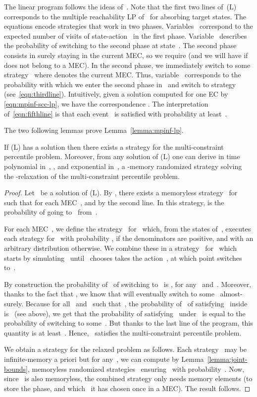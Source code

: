 \documentclass{llncs}
\begin{document}
  The linear program follows the ideas of~\cite{EKVY-lmcs08,BBCFK-lmcs14}. 
  Note that the first two lines of~(L) corresponds to the multiple reachability LP of~\cite{EKVY-lmcs08} for absorbing target states.
The equations encode strategies that work in two phases.
  Variables~ correspond to
  the expected number of visits of state-action~ in the first phase. Variable~ describes the probability 
  of switching to the second phase at state~.
  The second phase consists in surely staying in the current MEC, so we require 
  (and we will have  if  does not belong to a MEC).
  In the second phase, we immediately switch to some
	strategy~ where  denotes the current MEC. Thus, variable~ corresponds to the probability
  with which we enter the second phase in~ and switch to strategy~ (see~\eqref{eqn:thirdline}).
  Intuitively, given a solution  computed for one EC by \eqref{eqn:mpinf-scc-lp}, we have the correspondence
  .
  The interpretation of~\eqref{eqn:fifthline} is that each event~ is satisfied with probability at least~.

The two following lemmas prove Lemma~\ref{lemma:mpinf-lp}. 

\begin{lemma}
  If (L) has a solution then there exists a strategy for the multi-constraint percentile problem.
  Moreover, from any solution of (L) one can derive in time polynomial in~, , and exponential in~, a -memory randomized strategy
  solving the -relaxation of the multi-constraint percentile problem.
\end{lemma}

  
\begin{proof}
  Let~ be a solution of (L).
  By \cite[Theorem 3.2]{EKVY-lmcs08}, there exists a memoryless strategy~ for~ such that
   for each MEC~,
  and  by the second line.  
  In this strategy,  is the probability of going to~ from~.

  For each MEC~, we define the strategy~ for~ which, from the states of~,
  executes each strategy
   for~ with probability ,
  if the denominators are positive, and with an arbitrary distribution otherwise.
  We combine these in a strategy~ for~
  which starts by simulating~ until~ chooses takes the action~, at which point
   switches to~.

  By construction the probability of~ of switching to~ is
  , for any~ and~.
  Moreover, thanks to the fact that , we know that  will eventually switch to some~ almost-surely. 
  Because for all~ and~ such that~, the probability of~ of satisfying~ inside~ is~ (see above), 
  we get that the probability of satisfying~ under~ is equal to the probability of switching to some~.
  But thanks to the last line of the program, this quantity is at least~.
  Hence,~ satisfies the multi-constraint percentile problem.

  We obtain a strategy for the relaxed problem as follows. Each strategy~ may be infinite-memory a priori
  but for any~, we can compute by Lemma~\ref{lemma:joint-bounds}, memoryless randomized strategies~ ensuring~
  with probability~. Now, since~ is also memoryless, the combined strategy only needs  memory elements (to store the phase, and which~ it has chosen once in a MEC).
  The result follows.
\end{proof}
\end{document}
